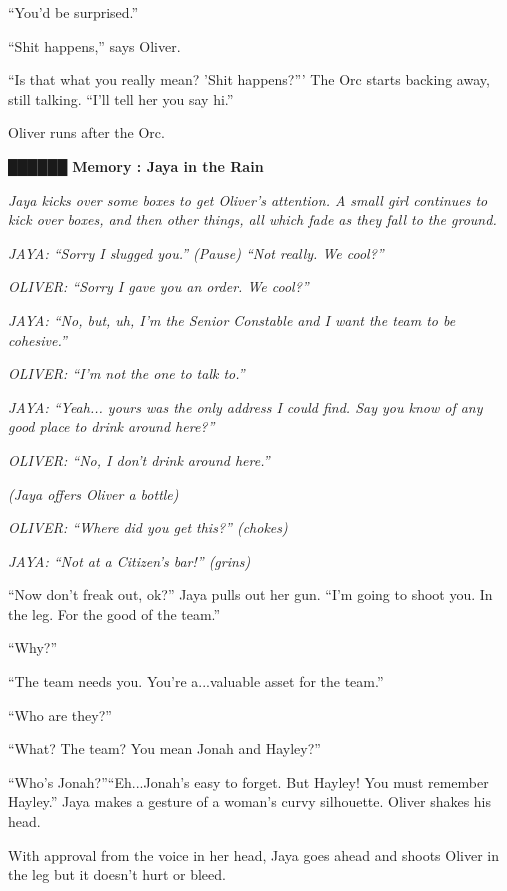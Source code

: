 ``You'd be surprised.''

``Shit happens,'' says Oliver.

``Is that what you really mean?  'Shit happens?'''  The Orc starts backing away, still talking. ``I'll tell her you say hi.''

Oliver runs after the Orc.



 {\LARGE \textbf{ {\color[RGB]{51,51,51}██████} } }  {\LARGE \textbf{ Memory : Jaya in the Rain} } 



\textit{Jaya kicks over some boxes to get Oliver's attention. A small girl continues to kick over boxes, and then other things, all which fade as they fall to the ground.}

\textit{JAYA: ``Sorry I slugged you.'' (Pause) ``Not really.  We cool?''}

\textit{OLIVER: ``Sorry I gave you an order.  We cool?''}

\textit{JAYA: ``No, but, uh, I'm the Senior Constable and I want the team to be cohesive.''}

\textit{OLIVER: ``I'm not the one to talk to.''}

\textit{JAYA: ``Yeah... yours was the only address I could find.  Say you know of any good place to drink around here?''}

\textit{OLIVER: ``No, I don't drink around here.''}

\textit{(Jaya offers Oliver a bottle)}

\textit{OLIVER:  ``Where did you get this?'' (chokes)}

\textit{JAYA: ``Not at a Citizen's bar!'' (grins)}



``Now don't freak out, ok?'' Jaya pulls out her gun.  ``I'm going to shoot you.  In the leg.  For the good of the team.''

``Why?''

``The team needs you.  You're a...valuable asset for the team.''

``Who are they?''

``What?  The team?  You mean Jonah and Hayley?''

``Who's Jonah?''``Eh...Jonah's easy to forget.  But Hayley!  You must remember Hayley.''  Jaya makes a gesture of a woman's curvy silhouette.  Oliver shakes his head.



With approval from the voice in her head, Jaya goes ahead and shoots Oliver in the leg but it doesn't hurt or bleed.



